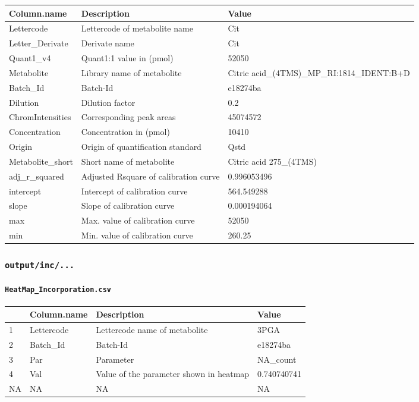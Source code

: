 \documentclass[]{book}
\let\oldparagraph\paragraph
\renewcommand{\paragraph}[1]{\oldparagraph{#1}\mbox{}}
\begin{document}
\begin{tabu} to 
\toprule
Column.name & Description & Value\\
\midrule
{}  Lettercode & Lettercode of metabolite name & Cit\\
Letter\_Derivate & Derivate name & Cit\\
  Quant1\_v4 & Quant1:1 value in (pmol) & 52050\\
Metabolite & Library name of metabolite & Citric acid\_(4TMS)\_MP\_RI:1814\_IDENT:B+D\\
  Batch\_Id & Batch-Id & e18274ba\\
\addlinespace
Dilution & Dilution factor & 0.2\\
  ChromIntensities & Corresponding peak areas & 45074572\\
Concentration & Concentration in (pmol) & 10410\\
  Origin & Origin of quantification standard & Qstd\\
Metabolite\_short & Short name of metabolite & Citric acid 275\_(4TMS)\\
\addlinespace
{}  adj\_r\_squared & Adjusted Rsquare of calibration curve & 0.996053496\\
intercept & Intercept of calibration curve & 564.549288\\
  slope & Slope of calibration curve & 0.000194064\\
max & Max. value of calibration curve & 52050\\
  min & Min. value of calibration curve & 260.25\\
\bottomrule
\end{tabu}

\hypertarget{outputinc...}{%
\subsubsection{\texorpdfstring{\texttt{output/inc/...}}{output/inc/...}}\label{outputinc...}}

\hypertarget{heatmap_incorporation.csv}{%
\paragraph{\texorpdfstring{\texttt{HeatMap\_Incorporation.csv}}{HeatMap\_Incorporation.csv}}\label{heatmap_incorporation.csv}}

\begin{tabular}{llll}
\toprule
  & Column.name & Description & Value\\
\midrule
1 & Lettercode & Lettercode name of metabolite & 3PGA\\
2 & Batch\_Id & Batch-Id & e18274ba\\
3 & Par & Parameter & NA\_count\\
4 & Val & Value of the parameter shown in heatmap & 0.740740741\\
NA & NA & NA & NA\\
\bottomrule
\end{tabular}
\end{document}

